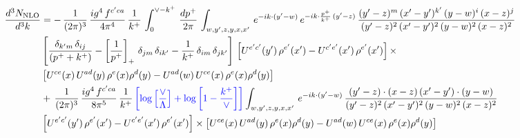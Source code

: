 \documentclass[9pt]{article}
\numberwithin{equation}{section}
\begin{document}
\begin{align}
    \frac{d^{3}N_{\rm NLO}}{d^{3}k} & = -\,\frac{1}{(2\pi)^{3}}\, \frac{ig^{4}\,f^{c'ca}}{4\pi^{4}}\, \frac{1}{k^{+}}\,\int_{0}^{\vee-k^{+}}\, \frac{dp^{+}}{2\pi}\, \int_{w,y',z,y,x,x'}\, e^{-ik\cdot (y'-w)}\, e^{-ik\cdot \frac{p^{+}}{k^{+}}\,(y'-z)}\,\frac{(y'-z)^{m}\,(x'-y')^{k'}\,(y-w)^{i}\,(x-z)^{j}}{(y'-z)^{2}\,(x'-y')^{2}\,(y-w)^{2}\,(x-z)^{2}}\notag \\ & \left[\frac{\delta_{k'm}\,\delta_{ij}}{(p^{+}+k^{+})}-\left[\frac{1}{p^{+}}\right]_{+}\,\delta_{jm}\,\delta_{ik'}-\frac{1}{k^{+}}\, \delta_{im}\, \delta_{jk'}\right]\, \left[U^{e'c'}(y')\,\rho^{e'}(x')-U^{c'e'}(x')\,\rho^{e'}(x')\right]\times \notag \\ &  \left[U^{ce}(x)\,U^{ad}(y)\,\rho^{e}(x)\rho^{d}(y)-U^{ad}(w)\,U^{ce}(x)\,\rho^{e}(x)\rho^{d}(y)\right]\notag \\ & +\,\frac{1}{(2\pi)^{3}}\, \frac{ig^{4}\,f^{c'ca}}{8\pi^{5}}\, \frac{1}{k^{+}}\,{\color{blue}\left[\log{\left[\frac{\vee}{\Lambda}\right]} + \log{\left[1-\frac{k^{+}}{\vee}\right]}\right]} \int_{w,y',z,y,x,x'}\, e^{-ik\cdot (y'-w)}\,\frac{(y'-z)\cdot (x-z)\,(x'-y')\cdot (y-w)}{(y'-z)^{2}\,(x'-y')^{2}\,(y-w)^{2}\,(x-z)^{2}}\notag \\ & \left[U^{e'c'}(y')\,\rho^{e'}(x')-U^{c'e'}(x')\,\rho^{e'}(x')\right]\times  \left[U^{ce}(x)\,U^{ad}(y)\,\rho^{e}(x)\rho^{d}(y)-U^{ad}(w)\,U^{ce}(x)\,\rho^{e}(x)\rho^{d}(y)\right]
\end{align}
\end{document}
